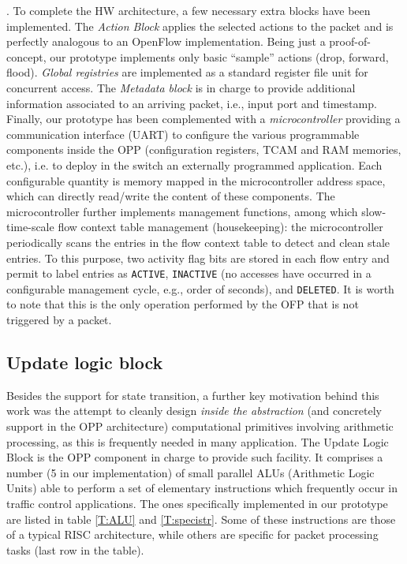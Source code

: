 \documentclass{sig-alternate}
\begin{document}
\vspace{3pt} . To complete the HW architecture, a few necessary extra blocks have been implemented. The {\em Action Block} applies the selected actions to the packet and is perfectly analogous to an OpenFlow implementation. Being just a proof-of-concept, our prototype implements only basic ``sample'' actions (drop, forward, flood). {\em Global registries} are implemented as a standard register file unit for concurrent access. The {\em Metadata block} is in charge to provide additional information associated to an arriving packet, i.e., input port and timestamp.
Finally, our prototype has been complemented with a {\em microcontroller} providing a communication interface (UART) to configure the various programmable components inside the OPP (configuration registers, TCAM and RAM memories, etc.), i.e. to deploy in the switch an externally programmed application. Each configurable quantity is memory mapped in the microcontroller address space, which can directly read/write the content of these components.  The microcontroller further implements management functions, among which slow-time-scale flow context table management (housekeeping): the microcontroller periodically scans the entries in the flow context table to detect and clean stale entries. To this purpose, two activity flag bits are stored in each flow entry and permit to label entries as \texttt{ACTIVE}, \texttt{INACTIVE} (no accesses have occurred in a configurable management cycle, e.g., order of seconds), and \texttt{DELETED}. It is worth to note that this is the only operation performed by the OFP that is not triggered by a packet.

\subsection{Update logic block}
\label{ss:alu}

Besides the support for state transition, a further key motivation behind this work was the attempt to cleanly design {\em inside the abstraction} (and concretely support in the OPP architecture) computational primitives involving arithmetic processing, as this is frequently needed in many application. The Update Logic Block is the OPP component in charge to provide such facility. It comprises a number (5 in our implementation) of small parallel ALUs (Arithmetic Logic Units) able to perform a set of elementary instructions which frequently occur in traffic control applications. The ones specifically implemented in our prototype are listed in table \ref{T:ALU} and \ref{T:specistr}. Some of these instructions are those of a typical RISC architecture, while others are specific for packet processing tasks (last row in the table). 
\end{document}
